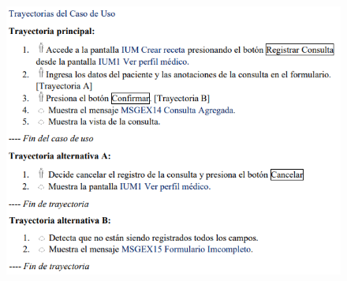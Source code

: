 \documentclass[12pt,letterpaper]{article}
\begin{document}
            \begin{figure}[H]
                \centering
                \includegraphics [scale=0.9]{specs/trayAgregarConsulta}
            \end{figure}
\end{document}
